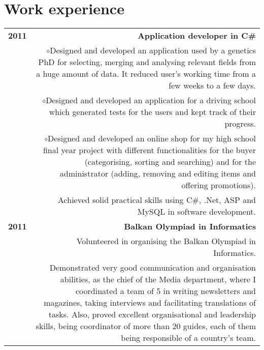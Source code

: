 \documentclass[11pt,a4paper]{article}
\begin{document}
\section*{Work experience\vspace{-2ex}}
\begin{tabular}{LR}
\bf 2011&\bf Application developer in C\#\vspace{5pt}\\
& \hspace{1em}$\circ$\hspace{1.5em}Designed and developed an application used by a genetics PhD for selecting, merging and analysing relevant fields from a huge amount of data. It reduced user's working time from a few weeks to a few days.\vspace{5pt}\\
& \hspace{1em}$\circ$\hspace{1.5em}Designed and developed an application for a driving school which generated tests for the users and kept track of their progress.\vspace{5pt}\\
& \hspace{1em}$\circ$\hspace{1.5em}Designed and developed an online shop for my high school final year project with different functionalities for the buyer (categorising, sorting and searching) and for the administrator (adding, removing and editing items and offering promotions).\vspace{5pt}\\
&Achieved solid practical skills using C\#, .Net, ASP and MySQL in software development.\vspace{5pt}\\
%
%
\bf 2011&\bf Balkan Olympiad in Informatics\\
&Volunteered in organising the Balkan Olympiad in Informatics.\vspace{5pt}\\
&Demonstrated very good communication and organisation abilities, as the chief of the Media department, where I coordinated a team of 5 in writing newsletters and magazines, taking interviews and facilitating translations of tasks. Also, proved excellent organisational and leadership skills, being coordinator of more than 20 guides, each of them being responsible of a country's team.\vspace{5pt}\\

\end{tabular}
\end{document}
